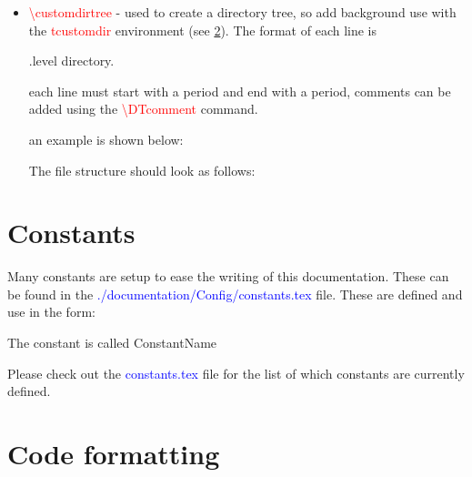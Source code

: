 \begin{itemize}
	\item \begin{minipage}[t]{\textwidth} 
	\textcolor{red}{\textbackslash{customdirtree}} - used to create a directory tree, so add background use with the \textcolor{red}{tcustomdir} environment (see \ref{ch:documentation:code_format}). The format of each line is 
	\begin{textbox}
	.{level} {directory}.
	\end{textbox}
	\noindent each line must start with a period and end with a period, comments can be added using the \textcolor{red}{\textbackslash{DTcomment}} command.

	\noindent an example is shown below:
	\begin{latexbox}
	The file structure should look as follows:
\begin{tcustomdir}
\end{tcustomdir}
	\end{latexbox}
	\end{minipage}

\end{itemize}


\clearpage
\newpage
\section{Constants}
\label{ch:documentation:constants}

Many constants are setup to ease the writing of this documentation. These can be found in the \textcolor{blue}{./documentation/Config/constants.tex} file. These are defined and use in the form:
\begin{latexbox}
\newcommand{\ConstantName}{ConstantName}
The constant is called \ConstantName
\end{latexbox}

\noindent Please check out the \textcolor{blue}{constants.tex} file for the list of which constants are currently defined.

\section{Code formatting}
\label{ch:documentation:code_format}


